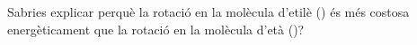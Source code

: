 \begin{exr}
Sabries explicar perquè la rotació en la molècula d'etilè () és més costosa energèticament que la rotació en la molècula d'età ()?
\end{exr}